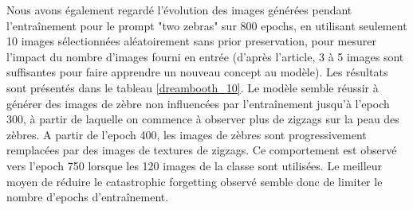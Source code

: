 \documentclass{article}
\begin{document}
Nous avons également regardé l'évolution des images générées pendant l'entraînement pour le prompt "two zebras" sur 800 epochs, en utilisant seulement 10 images sélectionnées aléatoirement sans prior preservation, pour mesurer l'impact du nombre d'images fourni en entrée (d'après l'article, 3 à 5 images sont suffisantes pour faire apprendre un nouveau concept au modèle). Les résultats sont présentés dans le tableau \ref{dreambooth_10}. Le modèle semble réussir à générer des images de zèbre non influencées par l'entraînement jusqu'à l'epoch 300, à partir de laquelle on commence à observer plus de zigzags sur la peau des zèbres. A partir de l'epoch 400, les images de zèbres sont progressivement remplacées par des images de textures de zigzags. Ce comportement est observé vers l'epoch 750 lorsque les 120 images de la classe sont utilisées. Le meilleur moyen de réduire le catastrophic forgetting observé semble donc de limiter le nombre d'epochs d'entraînement.
\end{document}
